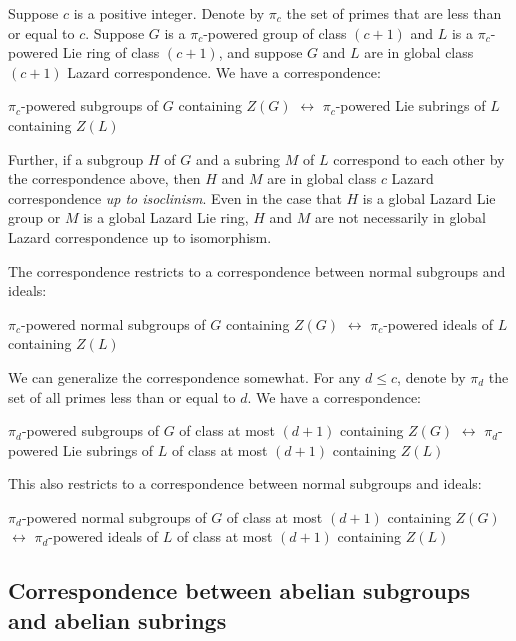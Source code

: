 Suppose $c$ is a positive integer. Denote by $\pi_c$ the set of primes
that are less than or equal to $c$. Suppose $G$ is a $\pi_c$-powered
group of class $(c + 1)$ and $L$ is a $\pi_c$-powered Lie ring of
class $(c + 1)$, and suppose $G$ and $L$ are in global class $(c + 1)$
Lazard correspondence. We have a correspondence:

\begin{center}
  $\pi_c$-powered subgroups of $G$ containing $Z(G)$ $\leftrightarrow$
  $\pi_c$-powered Lie subrings of $L$ containing $Z(L)$
\end{center}

Further, if a subgroup $H$ of $G$ and a subring $M$ of $L$ correspond
to each other by the correspondence above, then $H$ and $M$ are in
global class $c$ Lazard correspondence {\em up to isoclinism}. Even in
the case that $H$ is a global Lazard Lie group or $M$ is a global
Lazard Lie ring, $H$ and $M$ are not necessarily in global Lazard
correspondence up to isomorphism.

The correspondence restricts to a correspondence between normal
subgroups and ideals:

\begin{center}
  $\pi_c$-powered normal subgroups of $G$ containing $Z(G)$
  $\leftrightarrow$ $\pi_c$-powered ideals of $L$ containing $Z(L)$
\end{center}

We can generalize the correspondence somewhat. For any $d \le c$,
denote by $\pi_d$ the set of all primes less than or equal to $d$. We
have a correspondence:

\begin{center}
  $\pi_d$-powered subgroups of $G$ of class at most $(d + 1)$
  containing $Z(G)$ $\leftrightarrow$ $\pi_d$-powered Lie subrings of
  $L$ of class at most $(d + 1)$ containing $Z(L)$
\end{center}

This also restricts to a correspondence between normal subgroups and ideals:

\begin{center}
  $\pi_d$-powered normal subgroups of $G$ of class at most $(d + 1)$
  containing $Z(G)$ $\leftrightarrow$ $\pi_d$-powered ideals of $L$
  of class at most $(d + 1)$ containing $Z(L)$
\end{center}

\subsection{Correspondence between abelian subgroups and abelian subrings}

